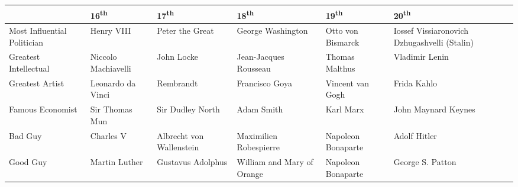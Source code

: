 \documentclass[12pt]{article}
\begin{document}
\begin{enumerate}
\begin{tabular}{|p{}|p{}|p{}|p{}|p{}|p{}|}
\hline
 & 16\textsuperscript{th} & 17\textsuperscript{th} & 18\textsuperscript{th} & 19\textsuperscript{th} & 20\textsuperscript{th} \\
\hline
Most Influential Politician & Henry VIII & Peter the Great & George Washington & Otto von Bismarck & Iossef Vissiaronovich Dzhugashvelli (Stalin)\\
\hline
Greatest Intellectual & Niccolo Machiavelli & John Locke & Jean-Jacques Rousseau & Thomas Malthus & Vladimir Lenin \\
\hline
Greatest Artist & Leonardo da Vinci  & Rembrandt & Francisco Goya & Vincent van Gogh & Frida Kahlo \\
\hline
Famous Economist & Sir Thomas Mun & Sir Dudley North & Adam Smith & Karl Marx & John Maynard Keynes \\
\hline
Bad Guy & Charles V & Albrecht von Wallenstein & Maximilien Robespierre & Napoleon Bonaparte & Adolf Hitler \\
\hline
Good Guy & Martin Luther & Gustavus Adolphus & William and Mary of Orange & Napoleon Bonaparte & George S. Patton  \\
\hline

\end{tabular}

\hspace{-40pt} \begin{tabular}{|p{}|p{}|p{}|p{}|p{}|p{}|}


\end{tabular}
\end{enumerate}
\end{document}
